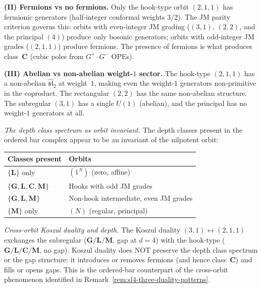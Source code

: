\begin{remark}
\medskip
\noindent\textbf{(II) Fermions vs no fermions.}
Only the hook-type orbit $(2,1,1)$ has fermionic generators
(half-integer conformal weights $3/2$). The JM parity
criterion governs this: orbits with even-integer JM grading
($(3,1)$, $(2,2)$, and the principal $(4)$) produce only
bosonic generators; orbits with odd-integer JM grades
($(2,1,1)$) produce fermions. The presence of fermions
is what produces class~$\mathbf{C}$ (cubic poles from
$G^+$--$G^-$ OPEs).

\medskip
\noindent\textbf{(III) Abelian vs non-abelian weight-$1$
sector.}
The hook-type $(2,1,1)$ has a non-abelian
$\widehat{\mathfrak{sl}}_2$ at weight~$1$, making even
the weight-$1$ generators non-primitive in the coproduct.
The rectangular $(2,2)$ has the same non-abelian structure.
The subregular $(3,1)$ has a single $U(1)$ (abelian), and
the principal has no weight-$1$ generators at all.

\medskip
\emph{The depth class spectrum as orbit invariant.}
The depth classes present in the ordered bar complex
appear to be an invariant of the nilpotent orbit:
\begin{center}
\renewcommand{\arraystretch}{1.15}
\begin{tabular}{ll}
\textbf{Classes present} & \textbf{Orbits} \\
\hline
$\{\mathbf{L}\}$ only & $(1^N)$ (zero, affine) \\
$\{\mathbf{G}, \mathbf{L}, \mathbf{C}, \mathbf{M}\}$
 & Hooks with odd JM grades \\
$\{\mathbf{G}, \mathbf{L}, \mathbf{M}\}$
 & Non-hook intermediate, even JM grades \\
$\{\mathbf{M}\}$ only & $(N)$ (regular, principal)
\end{tabular}
\end{center}

\emph{Cross-orbit Koszul duality and depth.}
The Koszul duality $(3,1) \leftrightarrow (2,1,1)$
exchanges the subregular ($\mathbf{G/L/M}$, gap at
$d=4$) with the hook-type ($\mathbf{G/L/C/M}$, no gap).
Koszul duality does NOT preserve the depth class
spectrum or the gap structure: it introduces or removes
fermions (and hence class~$\mathbf{C}$) and fills or
opens gaps. This is the ordered-bar counterpart of the
cross-orbit phenomenon identified in
Remark~\ref{rem:sl4-three-duality-patterns}.
\end{remark}

